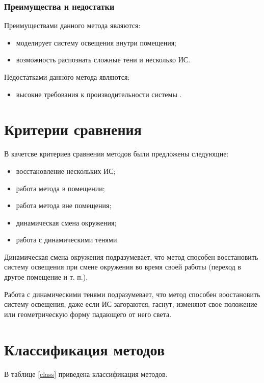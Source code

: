 \subsubsection*{Преимущества и недостатки}

Преимуществами данного метода являются:

\begin{itemize}
	\item моделирует систему освещения внутри помещения;
	\item возможность распознать сложные тени и несколько ИС.
\end{itemize}

Недостатками данного метода являются:

\begin{itemize}
	\item высокие требования к производительности системы \cite{tras}.
\end{itemize}

\section{Критерии сравнения}

В качетсве критериев сравнения методов были предложены следующие:

\begin{itemize}
	\item восстановление нескольких ИС;
	\item работа метода в помещении;
	\item работа метода вне помещения;
	\item динамическая смена окружения;
	\item работа с динамическими тенями.
\end{itemize}

Динамическая смена окружения подразумевает, что метод способен восстановить систему освещения при смене окружения во время своей работы (переход в другое помещение и т. п.).

Работа с динамическими тенями подразумевает, что метод способен воостановить систему освещения, даже если ИС загораются, гаснут, изменяют свое положение или геометрическую форму падающего от него света.

\section{Классификация методов}

В таблице \ref{class} приведена классификация методов.

